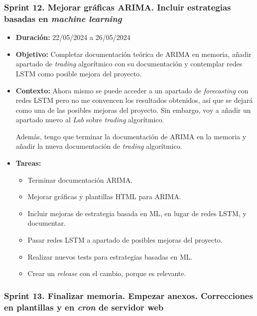 \subsubsection{Sprint 12. Mejorar gráficas ARIMA. Incluir estrategias basadas en \emph{machine learning}}

\begin{itemize}
\item  
\textbf{Duración:} 22/05/2024 a 26/05/2024

\item
\textbf{Objetivo:} Completar documentación teórica de ARIMA en memoria, añadir apartado de \emph{trading} algorítmico con su documentación y contemplar redes LSTM como posible mejora del proyecto. 


\item
\textbf{Contexto:} Ahora mismo se puede acceder a un apartado de \emph{forecasting} con redes LSTM pero no me convencen los resultados obtenidos, así que se dejará como una de las posibles mejoras del proyecto. Sin embargo, voy a añadir un apartado nuevo al \emph{Lab} sobre \emph{trading} algorítmico. 

Además, tengo que terminar la documentación de ARIMA en la memoria y añadir la nueva documentación de \emph{trading} algorítmico. 


\item
\textbf{Tareas:}
	\begin{itemize}
	\tightlist
	\item 
	Terminar documentación ARIMA. 
	\item
	Mejorar gráficas y plantillas HTML para ARIMA.  
	\item
	Incluir mejoras de estrategia basada en ML, en lugar de redes LSTM, y documentar. 
	\item
	Pasar redes LSTM a apartado de posibles mejoras del proyecto. 
	\item
	Realizar nuevos tests para estrategias basadas en ML.
	\item
	Crear un \emph{release} con el cambio, porque es relevante. 
  	\end{itemize}
\end{itemize}



\subsubsection{Sprint 13. Finalizar memoria. Empezar anexos. Correcciones en plantillas y en \emph{cron} de servidor web}

